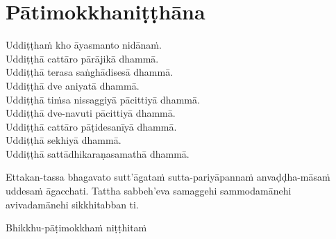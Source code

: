 \section{Pātimokkhaniṭṭhāna}
\label{patimokkhanitthana}

Uddiṭṭhaṁ kho āyasmanto nidānaṁ.\\
Uddiṭṭhā cattāro pārājikā dhammā.\\
Uddiṭṭhā terasa saṅghādisesā dhammā.\\
Uddiṭṭhā dve aniyatā dhammā.\\
Uddiṭṭhā tiṁsa nissaggiyā pācittiyā dhammā.\\
Uddiṭṭhā dve-navuti pācittiyā dhammā.\\
Uddiṭṭhā cattāro pāṭidesanīyā dhammā.\\
Uddiṭṭhā sekhiyā dhammā.\\
Uddiṭṭhā sattādhikaraṇasamathā dhammā.

Ettakan-tassa bhagavato sutt'āgataṁ sutta-pariyāpannaṁ anvaḍḍha-māsaṁ uddesaṁ āgacchati. Tattha sabbeh'eva samaggehi sammodamānehi avivadamānehi sikkhitabban ti.

\begin{outro}
  Bhikkhu-pāṭimokkhaṁ niṭṭhitaṁ
\end{outro}

\clearpage
